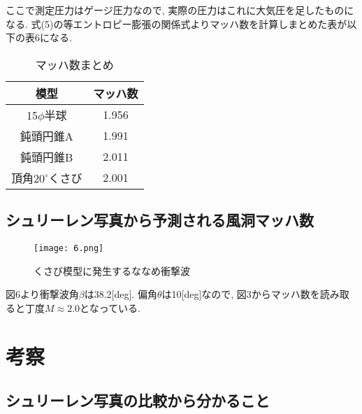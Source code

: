 \documentclass[12pt]{jsarticle}
\begin{document}
ここで測定圧力はゲージ圧力なので, 実際の圧力はこれに大気圧を足したものになる. 式(5)の等エントロピー膨張の関係式よりマッハ数を計算しまとめた表が以下の表6になる.
\begin{table}[htb]
  \begin{center}
    \caption{マッハ数まとめ}
    \begin{tabular}{|c|c|} \hline
      模型 & マッハ数 \\ \hline
      15$\phi$半球 & 1.956 \\ \hline
      鈍頭円錐A & 1.991 \\ \hline
      鈍頭円錐B & 2.011 \\ \hline
      頂角$20^{\circ}$くさび & 2.001 \\ \hline
    \end{tabular}
  \end{center}
\end{table}

\newpage
\subsection{シュリーレン写真から予測される風洞マッハ数}
\begin{figure}[htbp]
\begin{center}
\texttt{[image: 6.png]}
\caption{くさび模型に発生するななめ衝撃波}
\end{center}
\end{figure} \noindent
図6より衝撃波角$\beta$は38.2[deg]. 偏角$\theta$は10[deg]なので, 図3からマッハ数を読み取ると丁度$M\approx2.0$となっている.

\section{考察}
\subsection{シュリーレン写真の比較から分かること}
\end{document}
